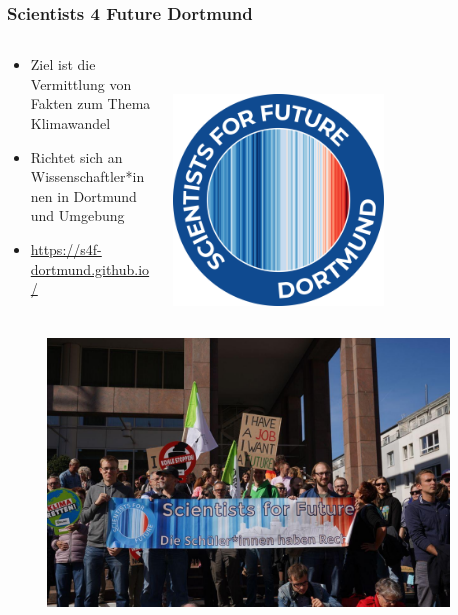 \begin{frame}
\frametitle{Scientists 4 Future Dortmund}
\begin{columns}[c] %
 \begin{column}{.78\textwidth}
	 \begin{itemize}
		\item Ziel ist die Vermittlung von Fakten zum Thema Klimawandel
		\item Richtet sich an Wissenschaftler*innen in Dortmund und Umgebung
	 	\item \url{https://s4f-dortmund.github.io/}
	 \end{itemize}
 \end{column}%
 \hfill%
 \begin{column}{.28\textwidth}
	 \centering
	 ~\\~\\
		 \includegraphics[width=0.625\textwidth]{bilder/s4f_logo_dortmund.png}
 \end{column}%
\end{columns}
\begin{columns} %
 \begin{column}{.48\textwidth}
	 \begin{figure}
		 \centering
		 \includegraphics[trim={0cm 0cm 0cm 2.5cm}, clip, width=0.95\textwidth]{bilder/demo.jpg}

\end{figure}
\end{column}
\end{columns}
\end{frame}
